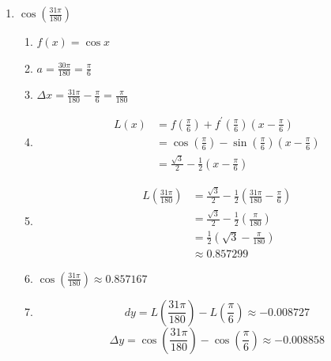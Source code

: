 \documentclass{ximera}
\begin{document}
\begin{problem}
\begin{explanation}
\begin{enumerate}
	\item $ \cos \left( \frac{31 \pi}{180} \right)$
  \begin{enumerate}
    \item  $f(x) = \cos x$
    \item $a = \frac{30 \pi}{180} = \frac{\pi}{6}$
    \item  $\Delta x = \frac{31 \pi}{180} - \frac{\pi}{6} = \frac{\pi}{180}$
    \item
    \begin{align*}
      L(x) &= f\left( \frac{\pi}{6} \right) + f^\prime \left(\frac{\pi}{6} \right) \left( x - \frac{\pi}{6} \right) \\
           &= \cos \left( \frac{\pi}{6} \right) - \sin \left(\frac{\pi}{6} \right) \left( x - \frac{\pi}{6} \right) \\
           &= \frac{\sqrt{3}}{2} - \frac{1}{2} \left( x - \frac{\pi}{6} \right) 
    \end{align*}
    \item 
    \begin{align*}
      L \left( \frac{31 \pi}{180} \right) &= \frac{\sqrt{3}}{2} - \frac{1}{2} \left( \frac{31 \pi}{180} - \frac{\pi}{6} \right) \\
                                          &=  \frac{\sqrt{3}}{2} - \frac{1}{2} \left( \frac{\pi}{180} \right) \\
                                          &= \frac{1}{2} \left( \sqrt{3} - \frac{\pi}{180} \right) \\
                                          &\approx 0.857299
    \end{align*}
    \item  $\cos \left( \frac{31 \pi}{180} \right) \approx 0.857167$
    \item
      $$ dy = L\left( \frac{31\pi}{180} \right) - L \left( \frac{\pi}{6} \right) \approx -0.008727 $$
      $$ \Delta y = \cos \left( \frac{31 \pi}{180} \right) - \cos \left( \frac{\pi}{6} \right) \approx -0.008858 $$
  \end{enumerate}
  

\end{enumerate}
\end{explanation}
\end{problem}
\end{document}
